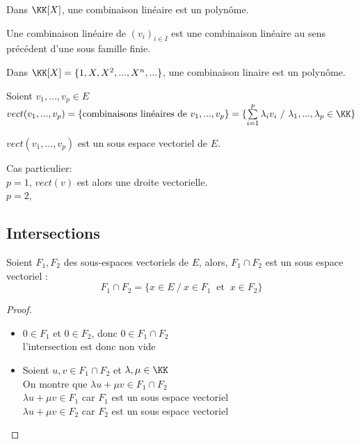 \documentclass[../main.tex]{subfile}
\begin{document}
\begin{ex}
	Dans $\KK[X]$, une combinaison linéaire est un polynôme.
\end{ex}

\begin{rema}
	Une combinaison linéaire de $(v_i)_{i \in I}$ est une combinaison linéaire au sens précédent d'une sous famille finie.
\end{rema}

\begin{ex}
	Dans $\KK[X] = \{1, X, X^2, ..., X^n, ...\}$, une combinaison linaire est un polynôme.
\end{ex}

\begin{defi}
	Soient $v_1, ..., v_p \in E$\\
	$vect(v_1, ..., v_p) = \{\text{combinaisons linéaires de $v_1, ..., v_p$}\} = \{\sum\limits_{i=1}^p \lambda_i v_i \ / \ \lambda_1, ..., \lambda_p \in \KK\}$
\end{defi}

\begin{prop}
	$vect(v_1, ..., v_p)$ est un sous espace vectoriel de $E$.
\end{prop}

\begin{ex}
	Cas particulier:\\
	$p = 1$, $vect(v)$ est alors une droite vectorielle.\\
	$p=2$, %
\end{ex}

\subsection{Intersections}
\begin{prop}
	Soient $F_1, F_2$ des sous-espaces vectoriels de $E$, 
	alors, $F_1 \cap F_2$ est un sous espace vectoriel :
	$$F_1 \cap F_2 = \{x \in E \ / \ x \in F_1 \ \text{ et } \ x \in F_2\}$$
\end{prop}

\begin{proof}
\begin{itemize}	
	\item $0 \in F_1$ et $0 \in F_2$, donc $0 \in F_1 \cap F_2$\\
	l'intersection est donc non vide

	\item Soient $u, v \in F_1 \cap F_2$ et $\lambda, \mu \in \KK$\\
	On montre que $\lambda u + \mu v \in F_1 \cap F_2$\\
	$\lambda u + \mu v \in F_1$ car $F_1$ est un sous espace vectoriel\\
	$\lambda u + \mu v \in F_2$ car $F_2$ est un sous espace vectoriel\\
\end{itemize}
\end{proof}
\end{document}

